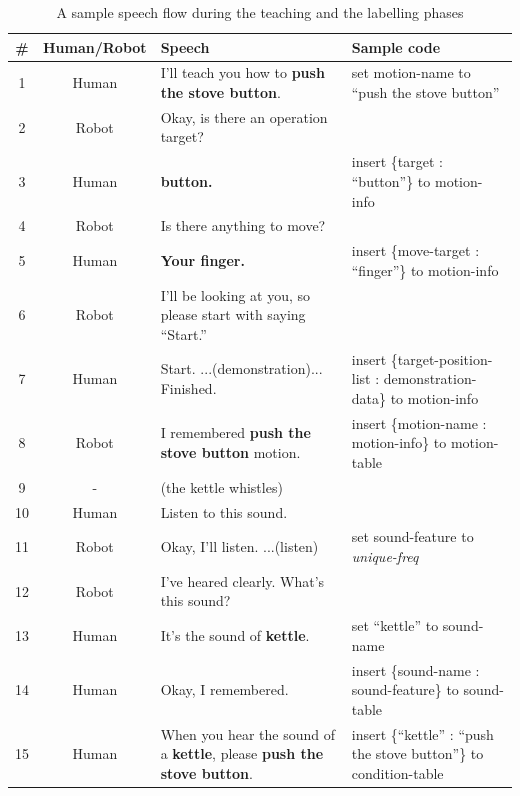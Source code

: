 \begin{table}[htbp]
  \begin{center}
    \vspace{-7mm}
    \caption{\small{A sample speech flow during the teaching and the labelling phases}}
    \vspace{-2mm}
    \footnotesize
    \begin{tabular}{|c|c|l|l|} \hline
      \# & Human/Robot & Speech & Sample code\\ \hline\hline
      1 & Human & I'll teach you how to {\bf push the stove button}. & set motion-name to ``push the stove button''\\
      2 & Robot & Okay, is there an operation target? &\\
      3 & Human & {\bf button.} & insert \{target : ``button''\} to motion-info \\
      4 & Robot & Is there anything to move? &\\
      5 & Human & {\bf Your finger.} & insert \{move-target : ``finger''\} to motion-info\\
      6 & Robot & I'll be looking at you, so please start with saying ``Start.'' &\\
      7 & Human & Start. ...(demonstration)... Finished. & insert \{target-position-list : demonstration-data\} to motion-info\\
      8 & Robot & I remembered {\bf push the stove button} motion. & insert \{motion-name : motion-info\} to motion-table\\ \hline\hline
      9 & - & (the kettle whistles) &\\
      10 & Human & Listen to this sound. &\\
      11 & Robot & Okay, I'll listen. ...(listen) & set sound-feature to {\sl unique-freq}\\
      12 & Robot & I've heared clearly. What's this sound? &\\
      13 & Human & It's the sound of {\bf kettle}. & set ``kettle'' to sound-name\\
      14 & Human & Okay, I remembered. & insert \{sound-name : sound-feature\} to sound-table\\ \hline\hline
      15 & Human & When you hear the sound of a {\bf kettle}, please {\bf push the stove button}. & insert \{``kettle'' : ``push the stove button''\} to condition-table\\ \hline
    \end{tabular}
    \label{table:speech_flow}
  \end{center}
  \vspace{-6mm}
\end{table}

